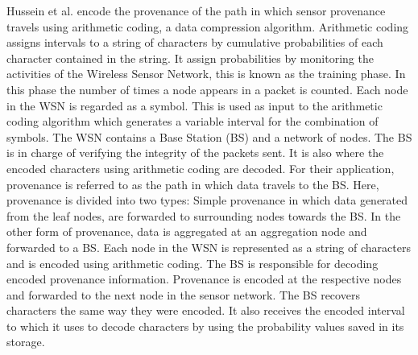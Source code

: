 %

Hussein et al. \cite{hussain_secure_2014} encode the provenance of the path in which  sensor provenance travels using arithmetic coding, a data compression algorithm. Arithmetic coding assigns intervals to a string of characters by  cumulative probabilities of each character contained in the string. It assign probabilities by monitoring the activities of the Wireless Sensor Network, this is known as the training phase. In this phase the number of times a node appears in a packet is counted. Each node in the WSN is regarded as a symbol. This is used as input to the arithmetic coding algorithm which generates a variable interval for the combination of symbols. The WSN contains a Base Station (BS) and a network of nodes. The BS is in charge of verifying the integrity of the packets sent. It is also where the encoded characters using arithmetic coding are decoded. For their application, provenance is referred to as the path in which data travels to the BS. Here, provenance is divided into two types: Simple provenance in which data generated from the leaf nodes, are forwarded to surrounding nodes towards the BS. In the other form of provenance, data is aggregated at an aggregation node and forwarded to a BS. Each node in the WSN is represented as a string of characters and is encoded using arithmetic coding. The BS is responsible for decoding encoded provenance information. Provenance is encoded at the respective nodes and forwarded to the next node in the sensor network. The BS recovers characters the same way they were encoded. It also receives the encoded interval to which it uses to decode characters by using the probability values saved in its storage.

